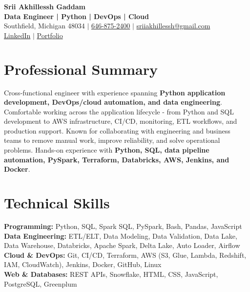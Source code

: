 \documentclass[letterpaper,10pt]{article}
\begin{document}
\fontsize{9.35pt}{10.45pt}\selectfont

\begin{center}
    {\LARGE \textbf{Srii Akhillessh Gaddam}} \\[-1pt]
    \textbf{Data Engineer | Python | DevOps | Cloud} \\[2pt]
    Southfield, Michigan 48034 $|$
    \href{tel:6468752400}{646-875-2400} $|$
    \href{mailto:sriiakhillessh@gmail.com}{sriiakhillessh@gmail.com} \\[1pt]
    \href{https://www.linkedin.com/in/srii-akhiilessh-gaddam-b48668191/}{LinkedIn} $|$
    \href{https://sriiakhillesshg.github.io/portfolio/}{Portfolio}
\end{center}
\vspace{-8pt}

\section{Professional Summary}
\small{Cross-functional engineer with experience spanning \textbf{Python application development, DevOps/cloud automation, and data engineering}. Comfortable working across the application lifecycle - from Python and SQL development to AWS infrastructure, CI/CD, monitoring, ETL workflows, and production support. Known for collaborating with engineering and business teams to remove manual work, improve reliability, and solve operational problems. Hands-on experience with \textbf{Python, SQL, data pipeline automation, PySpark, Terraform, Databricks, AWS, Jenkins, and Docker}.}

\section{Technical Skills}
\small{
\textbf{Programming:} Python, SQL, Spark SQL, PySpark, Bash, Pandas, JavaScript \\
\textbf{Data Engineering:} ETL/ELT, Data Modeling, Data Validation, Data Lake, Data Warehouse, Databricks, Apache Spark, Delta Lake, Auto Loader, Airflow \\
\textbf{Cloud \& DevOps:} Git, CI/CD, Terraform, AWS (S3, Glue, Lambda, Redshift, IAM, CloudWatch), Jenkins, Docker, GitHub, Linux \\
\textbf{Web \& Databases:} REST APIs, Snowflake, HTML, CSS, JavaScript, PostgreSQL, Greenplum
}
\end{document}
